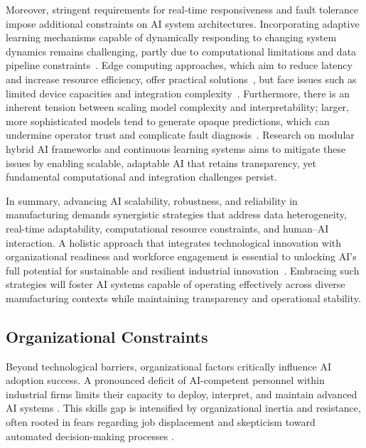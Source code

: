 \documentclass[sigconf]{acmart}
\begin{document}
Moreover, stringent requirements for real-time responsiveness and fault tolerance impose additional constraints on AI system architectures. Incorporating adaptive learning mechanisms capable of dynamically responding to changing system dynamics remains challenging, partly due to computational limitations and data pipeline constraints~\cite{ref31,ref32}. Edge computing approaches, which aim to reduce latency and increase resource efficiency, offer practical solutions~\cite{ref31}, but face issues such as limited device capacities and integration complexity~\cite{ref32}. Furthermore, there is an inherent tension between scaling model complexity and interpretability; larger, more sophisticated models tend to generate opaque predictions, which can undermine operator trust and complicate fault diagnosis~\cite{ref2}. Research on modular hybrid AI frameworks and continuous learning systems aims to mitigate these issues by enabling scalable, adaptable AI that retains transparency, yet fundamental computational and integration challenges persist.

In summary, advancing AI scalability, robustness, and reliability in manufacturing demands synergistic strategies that address data heterogeneity, real-time adaptability, computational resource constraints, and human–AI interaction. A holistic approach that integrates technological innovation with organizational readiness and workforce engagement is essential to unlocking AI's full potential for sustainable and resilient industrial innovation~\cite{ref6,ref19}. Embracing such strategies will foster AI systems capable of operating effectively across diverse manufacturing contexts while maintaining transparency and operational stability.

\subsection{Organizational Constraints}

Beyond technological barriers, organizational factors critically influence AI adoption success. A pronounced deficit of AI-competent personnel within industrial firms limits their capacity to deploy, interpret, and maintain advanced AI systems \cite{ref7,ref26}. This skills gap is intensified by organizational inertia and resistance, often rooted in fears regarding job displacement and skepticism toward automated decision-making processes \cite{ref3,ref26}.
\end{document}
